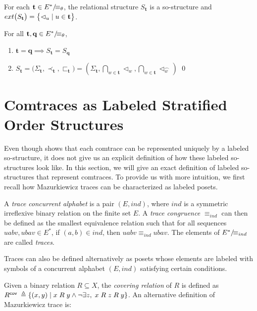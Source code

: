\documentclass{llncs}
\begin{document}
\begin{theorem}[\cite{JK95}]
For each $\mathbf{t}\in {E^*}/\!{\equiv_{\theta}}$, the relational structure $S_{\mathbf{t}}$ is a so-structure and $ext\bigl(S_{\mathbf{t}}\bigr) = \bigl\{ \lhd_u \mid u \in \mathbf{t} \bigr\}$. \END
\label{theo:com2sos}
\end{theorem}

\begin{corollary} For all $\mathbf{t},\mathbf{q}\in {E^*}/\!{\equiv_{\theta}}$,
\begin{enumerate}
\item $\mathbf{t}=\mathbf{q} \implies S_{\mathbf{t}} = S_{\mathbf{q}}$
\item $ S_{\mathbf{t}}  = \bigl( \Sigma_{\mathbf{t}}, \prec_{\mathbf{t}} ,\sqsubset_{\mathbf{t}} \bigr) = \left( \Sigma_{\mathbf{t}}, \bigcap_{w\in \mathbf{t}}\lhd_{w} ,\bigcap_{w\in \mathbf{t}}\lhd_{w}^{\frown} \right)$ 
\qed
\end{enumerate}
\label{cor:com2sos}
\end{corollary}



\section{Comtraces as Labeled Stratified Order Structures \label{sec:lsos-comtrace}}
Even though  shows that each comtrace can be represented uniquely by a labeled so-structure, it does not give us an explicit definition of how these labeled so-structures look like. In this section, we will give an exact definition of labeled so-structures that represent comtraces. To provide us with more intuition, we first recall how Mazurkiewicz traces can be characterized as labeled posets.

A \emph{trace concurrent alphabet}  is  a pair $(E,ind)$, where
$ind$ is a symmetric irreflexive binary relation on the finite set $E$. A \emph{trace congruence} $\equiv_{ind}$ can then be defined as the smallest  equivalence relation such that for all sequences $uabv, ubav \in E^*$, if $(a,b) \in \textit{ind}$, then $uabv \equiv_{ind} ubav$. The elements of ${E^{*}}/\!{\equiv_{ind}}$ are called \emph{traces}.  

Traces can also be defined alternatively as posets whose elements are labeled with symbols of a concurrent alphabet $(E,ind)$ satisfying certain conditions.  

Given a binary relation $R\subseteq X$, the \emph{covering relation} of $R$ is defined as ${R}^{\mathsf{cov}\;}\triangleq \{(x,y)\mid x\; R\; y \wedge \neg \exists z,\; x\; R\; z\; R \;y \}$. An alternative definition of Mazurkiewicz trace is:
\end{document}

